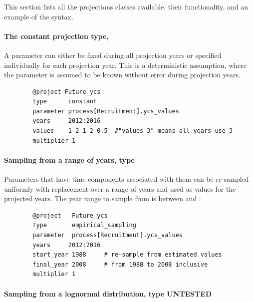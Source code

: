 \subsubsection{\label{sec:projections}}

This section lists all the projections classes available, their functionality, and an example of the syntax.

\paragraph[Constant]{The constant projection type, }

A parameter can either be fixed during all projection years or specified individually for each projection year. This is a deterministic assumption, where the parameter is assumed to be known without error during projection years.

{\small{\begin{verbatim}
		@project Future_ycs
		type      constant
		parameter process[Recruitment].ycs_values
		years     2012:2016
		values    1 2 1 2 0.5  #"values 3" means all years use 3
		multiplier 1
		\end{verbatim}}}

\paragraph[Empirical resampling]{Sampling from a range of years, type  }

Parameters that have time components associated with them can be re-sampled uniformly with replacement over a range of years and used as values for the projected years. The year range to sample from is between  and :

{\small{\begin{verbatim}
		@project   Future_ycs
		type       empirical_sampling
		parameter  process[Recruitment].ycs_values
		years     2012:2016
		start_year 1988     # re-sample from estimated values
		final_year 2008     # from 1988 to 2008 inclusive
		multiplier 1
		\end{verbatim}}}


\paragraph[Lognormal]{Sampling from a lognormal distribution, type   UNTESTED}

